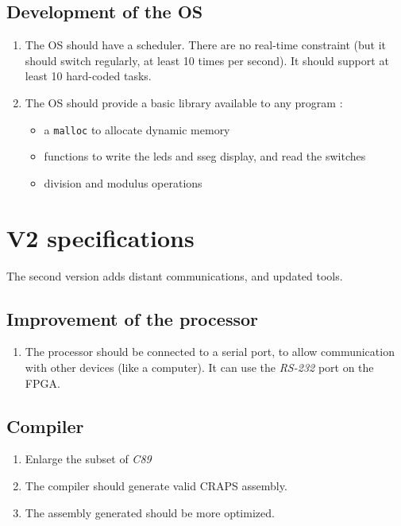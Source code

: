 \documentclass{article}
\begin{document}
      \subsection{Development of the OS}
        \begin{enumerate}
          \item The OS should have a scheduler. There are no real-time
          constraint (but it should switch regularly, at least 10 times per
          second). It should support at least 10 hard-coded tasks.
          \item The OS should provide a basic library available to any program :
            \begin{itemize}
              \item a \verb+malloc+ to allocate dynamic memory
              \item functions to write the leds and sseg display, and read the
                 switches
              \item division and modulus operations
             \end{itemize}
        \end{enumerate}

    \section{V2 specifications}
    The second version adds distant communications, and updated tools.
      \subsection{Improvement of the processor}
        \begin{enumerate}
          \item The processor should be connected to a serial port, to allow 
            communication with other devices (like a computer). It can use the
            \textit{RS-232} port on the FPGA.
        \end{enumerate}

      \subsection{Compiler}
        \begin{enumerate}     
          \item Enlarge the subset of \textit{C89}
          \item The compiler should generate valid CRAPS assembly.
          \item The assembly generated should be more optimized. 
        \end{enumerate}
\end{document}
